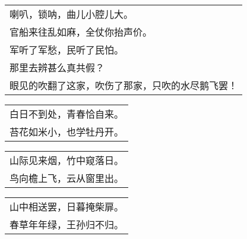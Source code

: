 \noindent\begin{minipage}{\linewidth}
  \vskip-3pt\begin{table}[H]
    \centering
    \begin{tabular}{@{}l@{}}
喇叭，锁呐，曲儿小腔儿大。\\
官船来往乱如麻，全仗你抬声价。\\
军听了军愁，民听了民怕。\\
那里去辨甚么真共假？\\
眼见的吹翻了这家，吹伤了那家，只吹的水尽鹅飞罢！
    \end{tabular}
  \end{table}
\end{minipage}
\vspace{1cm}


\noindent\begin{minipage}{\linewidth}
  \vskip-3pt\begin{table}[H]
    \centering
    \begin{tabular}{@{}l@{}}
白日不到处，青春恰自来。\\
苔花如米小，也学牡丹开。
    \end{tabular}
  \end{table}
\end{minipage}
\vspace{1cm}


\noindent\begin{minipage}{\linewidth}
  \vskip-3pt\begin{table}[H]
    \centering
    \begin{tabular}{@{}l@{}}
山际见来烟，竹中窥落日。\\
鸟向檐上飞，云从窗里出。
    \end{tabular}
  \end{table}
\end{minipage}
\vspace{1cm}


\noindent\begin{minipage}{\linewidth}
  \vskip-3pt\begin{table}[H]
    \centering
    \begin{tabular}{@{}l@{}}
山中相送罢，日暮掩柴扉。\\
春草年年绿，王孙归不归。
    \end{tabular}
  \end{table}
\end{minipage}
\vspace{1cm}


